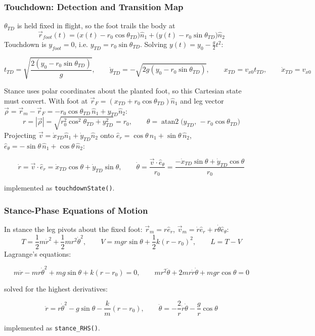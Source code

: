 \documentclass[10pt]{article}
\begin{document}
\subsubsection*{Touchdown: Detection and Transition Map}
$\theta_{TD}$ is held fixed in flight, so the foot trails the body at
\[
    \vec r_{foot}(t) = \big(x(t)-r_0\cos\theta_{TD}\big)\hat n_1
    + \big(y(t)-r_0\sin\theta_{TD}\big)\hat n_2
\]
Touchdown is $y_{foot}=0$, i.e. $y_{TD}=r_0\sin\theta_{TD}$. Solving
$y(t)=y_0-\tfrac g2t^2$:
\begin{result}
\[
    t_{TD}=\sqrt{\frac{2(y_0-r_0\sin\theta_{TD})}{g}}, \qquad
    \dot y_{TD}=-\sqrt{2g(y_0-r_0\sin\theta_{TD})}, \qquad
    x_{TD}=v_{x0}t_{TD}, \qquad \dot x_{TD}=v_{x0}
\]
\end{result}
Stance uses polar coordinates about the planted foot, so this Cartesian
state must convert. With foot at
$\vec r_F=(x_{TD}+r_0\cos\theta_{TD})\hat n_1$ and leg vector
$\vec\rho=\vec r_m-\vec r_F=-r_0\cos\theta_{TD}\,\hat n_1+y_{TD}\hat n_2$:
\[
    r = |\vec\rho| = \sqrt{r_0^2\cos^2\theta_{TD}+y_{TD}^2} = r_0, \qquad
    \theta = \operatorname{atan2}\!\big(y_{TD},\,-r_0\cos\theta_{TD}\big)
\]
Projecting $\vec v=\dot x_{TD}\hat n_1+\dot y_{TD}\hat n_2$ onto
$\hat e_r=\cos\theta\,\hat n_1+\sin\theta\,\hat n_2$,
$\hat e_\theta=-\sin\theta\,\hat n_1+\cos\theta\,\hat n_2$:
\begin{result}
\[
    \dot r = \vec v\cdot\hat e_r = \dot x_{TD}\cos\theta+\dot y_{TD}\sin\theta,
    \qquad
    \dot\theta = \frac{\vec v\cdot\hat e_\theta}{r_0}
    = \frac{-\dot x_{TD}\sin\theta+\dot y_{TD}\cos\theta}{r_0}
\]
\end{result}
implemented as \texttt{touchdownState()}.

\subsubsection*{Stance-Phase Equations of Motion}
In stance the leg pivots about the fixed foot: $\vec r_m=r\hat e_r$,
$\vec v_m = \dot r\hat e_r+r\dot\theta\hat e_\theta$:
\[
    T=\frac12m\dot r^2+\frac12mr^2\dot\theta^2, \qquad
    V=mgr\sin\theta+\frac12k(r-r_0)^2, \qquad
    L=T-V
\]
Lagrange's equations:
\begin{result}
\[
    m\ddot r-mr\dot\theta^2+mg\sin\theta+k(r-r_0)=0, \qquad
    mr^2\ddot\theta+2mr\dot r\dot\theta+mgr\cos\theta=0
\]
\end{result}
solved for the highest derivatives:
\begin{result}
\[
    \ddot r = r\dot\theta^2-g\sin\theta-\frac{k}{m}(r-r_0), \qquad
    \ddot\theta = -\frac{2}{r}\dot r\dot\theta-\frac{g}{r}\cos\theta
\]
\end{result}
implemented as \texttt{stance\_RHS()}.
\end{document}
